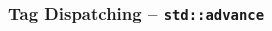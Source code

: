 \documentclass[svgnames]{beamer}
\begin{document}
\begin{frame}
\frametitle{Tag Dispatching -- \texttt{std::advance}}
\begin{overlayarea}{\textwidth}{10cm}
\end{overlayarea}
\end{frame}
\end{document}
